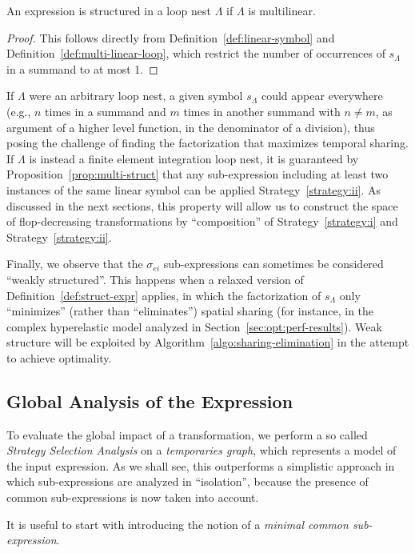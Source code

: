\begin{Prop}
\label{prop:multi-struct}
An expression is structured in a loop nest $\Lambda$ if $\Lambda$ is multilinear.
\end{Prop}
\begin{proof}
This follows directly from Definition~\ref{def:linear-symbol} and Definition~\ref{def:multi-linear-loop}, which restrict the number of occurrences of $s_{\Lambda}$ in a summand to at most 1.
\end{proof}
If $\Lambda$ were an arbitrary loop nest, a given symbol $s_{\Lambda}$ could appear everywhere (e.g., $n$ times in a summand and $m$ times in another summand with $n \neq m$, as argument of a higher level function, in the denominator of a division), thus posing the challenge of finding the factorization that maximizes temporal sharing. If $\Lambda$ is instead a finite element integration loop nest, it is guaranteed by Proposition~\ref{prop:multi-struct} that any sub-expression including at least two instances of the same linear symbol can be applied Strategy~\ref{strategy:ii}. As discussed in the next sections, this property will allow us to construct the space of flop-decreasing transformations by ``composition'' of Strategy~\ref{strategy:i} and Strategy~\ref{strategy:ii}.

Finally, we observe that the $\sigma_{ei}$ sub-expressions can sometimes be considered ``weakly structured''. This happens when a relaxed version of Definition~\ref{def:struct-expr} applies, in which the factorization of $s_{\Lambda}$ only ``minimizes'' (rather than ``eliminates'') spatial sharing (for instance, in the complex hyperelastic model analyzed in Section~\ref{sec:opt:perf-results}). Weak structure will be exploited by Algorithm~\ref{algo:sharing-elimination} in the attempt to achieve optimality.


\subsection{Global Analysis of the Expression}
\label{sec:opt:driving-se}
To evaluate the global impact of a transformation, we perform a so called {\em Strategy Selection Analysis} on a {\em temporaries graph}, which represents a model of the input expression. As we shall see, this outperforms a simplistic approach in which sub-expressions are analyzed in ``isolation'', because the presence of common sub-expressions is now taken into account.

It is useful to start with introducing the notion of a {\em minimal common sub-expression}.

